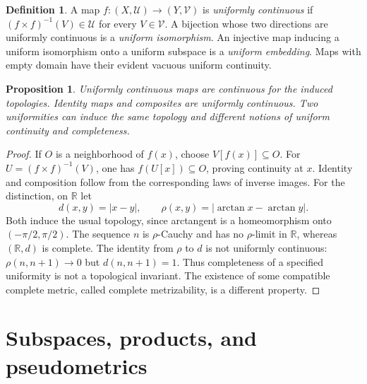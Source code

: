 \documentclass[11pt,oneside,openany]{book}
\newtheorem{proposition}[theorem]{Proposition}
\theoremstyle{definition}
\newtheorem{definition}[theorem]{Definition}
\theoremstyle{remark}
\newcommand{\R}{\mathbb R}\newcommand{\C}{\mathbb C}
\begin{document}
\begin{definition}\label{d10:12:uniform-continuity}
A map $f:(X,\mathcal U)\to(Y,\mathcal V)$ is \emph{uniformly continuous} if $(f\times f)^{-1}(V)\in\mathcal U$ for every $V\in\mathcal V$. A bijection whose two directions are uniformly continuous is a \emph{uniform isomorphism}. An injective map inducing a uniform isomorphism onto a uniform subspace is a \emph{uniform embedding}. Maps with empty domain have their evident vacuous uniform continuity.
\end{definition}

\begin{proposition}\label{d10:12:continuity-calculus}
Uniformly continuous maps are continuous for the induced topologies. Identity maps and composites are uniformly continuous. Two uniformities can induce the same topology and different notions of uniform continuity and completeness.
\end{proposition}
\begin{proof}
If $O$ is a neighborhood of $f(x)$, choose $V[f(x)]\subseteq O$. For $U=(f\times f)^{-1}(V)$, one has $f(U[x])\subseteq O$, proving continuity at $x$. Identity and composition follow from the corresponding laws of inverse images. For the distinction, on $\R$ let
\[
 d(x,y)=|x-y|,\qquad \rho(x,y)=|\arctan x-\arctan y|.
\]
Both induce the usual topology, since arctangent is a homeomorphism onto $(-\pi/2,\pi/2)$. The sequence $n$ is $\rho$-Cauchy and has no $\rho$-limit in $\R$, whereas $(\R,d)$ is complete. The identity from $\rho$ to $d$ is not uniformly continuous: $\rho(n,n+1)\to0$ but $d(n,n+1)=1$. Thus completeness of a specified uniformity is not a topological invariant. The existence of some compatible complete metric, called complete metrizability, is a different property.
\end{proof}

\section{Subspaces, products, and pseudometrics}
\end{document}
